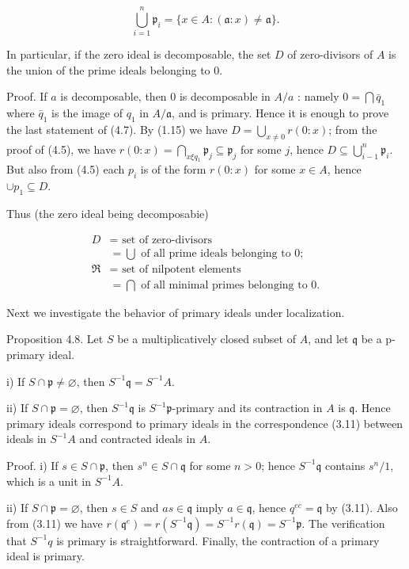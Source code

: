 \documentclass{standalone}
\theoremstyle{definition}
\theoremstyle{remark}
\begin{document}
\[
\bigcup_{i=1}^{n} \mathfrak{p}_{i}=\{x \in A:(\mathfrak{a}: x) \neq \mathfrak{a}\} .
\]

In particular, if the zero ideal is decomposable, the set $D$ of zero-divisors
of $A$ is the union of the prime ideals belonging to 0.

Proof. If $a$ is decomposable, then 0 is decomposable in $A / a$ : namely
$0=\bigcap \bar{q}_{1}$ where $\bar{q}_{1}$ is the image of $q_{1}$ in $A /
\mathfrak{a}$, and is primary. Hence it is enough to prove the last statement of
(4.7). By (1.15) we have $D=\bigcup_{x \neq 0} r(0: x)$; from the proof of
(4.5), we have $r(0: x)=\bigcap_{x \xi q_{1}} \mathfrak{p}_{j} \subseteq
\mathfrak{p}_{j}$ for some $j$, hence $D \subseteq \bigcup_{i-1}^{n}
\mathfrak{p}_{i}$. But also from (4.5) each $p_{i}$ is of the form $r(0: x)$ for
some $x \in A$, hence $\cup p_{1} \subseteq D$.

Thus (the zero ideal being decomposabie)

\[
\begin{aligned}
D & =\text { set of zero-divisors } \\
& =\bigcup \text { of all prime ideals belonging to } 0 ; \\
\mathfrak{R} & =\text { set of nilpotent elements } \\
& =\bigcap \text { of all minimal primes belonging to } 0 .
\end{aligned}
\]

Next we investigate the behavior of primary ideals under localization.

Proposition 4.8. Let $S$ be a multiplicatively closed subset of $A$, and let
$\mathfrak{q}$ be a p-primary ideal.

i) If $S \cap \mathfrak{p} \neq \varnothing$, then $S^{-1} \mathfrak{q}=S^{-1}
A$.

ii) If $S \cap \mathfrak{p}=\varnothing$, then $S^{-1} \mathfrak{q}$ is $S^{-1}
\mathfrak{p}$-primary and its contraction in $A$ is $\mathfrak{q}$. Hence
primary ideals correspond to primary ideals in the correspondence (3.11) between
ideals in $S^{-1} A$ and contracted ideals in $A$.

Proof. i) If $s \in S \cap \mathfrak{p}$, then $s^{n} \in S \cap \mathfrak{q}$
for some $n>0$; hence $S^{-1} \mathfrak{q}$ contains $s^{n} / 1$, which is a
unit in $S^{-1} A$.

ii) If $S \cap \mathfrak{p}=\varnothing$, then $s \in S$ and $a s \in
\mathfrak{q}$ imply $a \in \mathfrak{q}$, hence $q^{e c}=\mathfrak{q}$ by
(3.11). Also from (3.11) we have $r\left(\mathfrak{q}^{e}\right)=r\left(S^{-1}
\mathfrak{q}\right)=S^{-1} r(\mathfrak{q})=S^{-1} \mathfrak{p}$. The
verification that $S^{-1} q$ is primary is straightforward. Finally, the
contraction of a primary ideal is primary.
\end{document}
